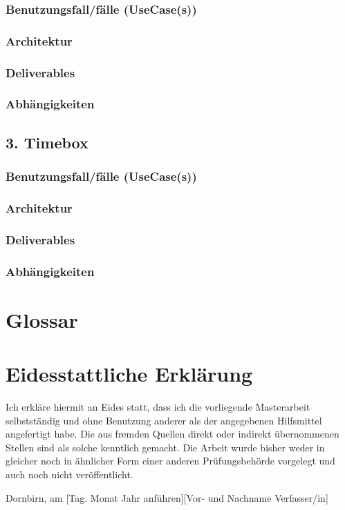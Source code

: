 \documentclass[a4paper,12pt,twoside]{scrreprt}
\begin{document}
    \subsection{Benutzungsfall/fälle (UseCase(s))  }
    \subsection{Architektur}
    \subsection{Deliverables}
    \subsection{Abhängigkeiten}

    \section{3. Timebox}
    \subsection{Benutzungsfall/fälle (UseCase(s))  }
    \subsection{Architektur}
    \subsection{Deliverables}
    \subsection{Abhängigkeiten}

    \chapter{Glossar}
        

    \chapter*{Eidesstattliche Erklärung}
    Ich erkläre hiermit an Eides statt, dass ich die vorliegende Masterarbeit selbstständig und ohne Benutzung anderer als der angegebenen Hilfsmittel angefertigt habe. Die aus fremden Quellen direkt oder indirekt übernommenen Stellen sind als solche kenntlich gemacht. Die Arbeit wurde bisher weder in gleicher noch in ähnlicher Form einer anderen Prüfungsbehörde vorgelegt und auch noch nicht veröffentlicht.

    \vspace{3cm}
    \noindent
    Dornbirn, am [Tag. Monat Jahr anführen]\hfill [Vor- und Nachname Verfasser/in]
\end{document}
